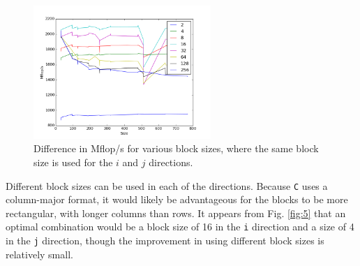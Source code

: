 \documentclass[10pt]{article}
\begin{document}
\begin{figure}[H]
\centering
\includegraphics[width=0.6\textwidth]{figures/256.png}
\caption{Difference in Mflop/s for various block sizes, where the same block size is used for the \(i\) and \(j\) directions.}
\label{fig:4}
\end{figure}

Different block sizes can be used in each of the directions. Because {\tt C} uses a column-major format, it would likely be advantageous for the blocks to be more rectangular, with longer columns than rows. It appears from Fig. \ref{fig:5} that an optimal combination would be a block size of 16 in the {\tt i} direction and a size of 4 in the {\tt j} direction, though the improvement in using different block sizes is relatively small.
\end{document}
